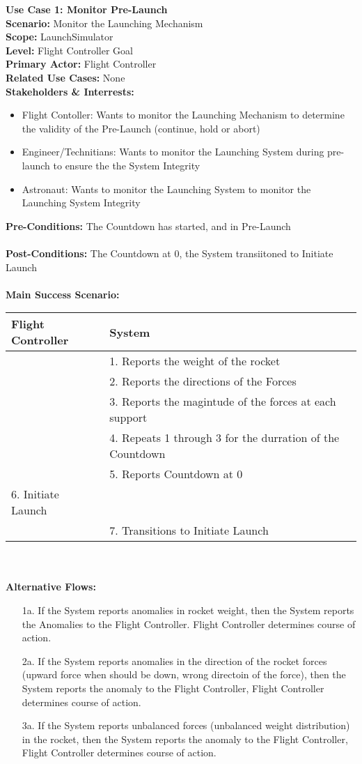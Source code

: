 \documentclass[letterpaper]{article}
\begin{document}
\noindent
\textbf{Use Case 1:  Monitor Pre-Launch}\\
\textbf{Scenario:  }Monitor the Launching Mechanism\\
\textbf{Scope:  }LaunchSimulator\\
\textbf{Level:  }Flight Controller Goal\\
\textbf{Primary Actor:  }Flight Controller\\
\textbf{Related Use Cases:  }None\\
\textbf{Stakeholders \& Interrests:}
\begin{itemize}
\item Flight Contoller:  Wants to monitor the Launching Mechanism to
determine the validity of the Pre-Launch (continue, hold or abort)
\item Engineer/Technitians:  Wants to monitor the Launching System 
during pre-launch to ensure the the System Integrity
\item Astronaut:  Wants to monitor the Launching System to monitor the
Launching System Integrity
\end{itemize}
\textbf{Pre-Conditions:  }The Countdown has started, and in
Pre-Launch\\\\
\textbf{Post-Conditions: }The Countdown at 0, the System transiitoned
to Initiate Launch\\\\
\textbf{Main Success Scenario:}\\
\begin{tabular}{|p{5.75cm}|p{5.75cm}|}\hline
\textbf{Flight Controller} & \textbf{System}\\\hline
& 1.  Reports the weight of the rocket\\\hline
& 2.  Reports the directions of the Forces\\\hline
& 3.  Reports the magintude of the forces at each support\\\hline
& 4.  Repeats 1 through 3 for the durration of the Countdown\\\hline
& 5.  Reports Countdown at 0\\\hline
6.  Initiate Launch &\\\hline
& 7.  Transitions to Initiate Launch\\\hline
\end{tabular}\\\\
\textbf{Alternative Flows:  }
\begin{itemize}
\item[1a.]If the System reports anomalies in rocket weight, then the System
reports the Anomalies to the Flight Controller.  Flight Controller
determines course of action.
\item[2a.]If the System reports anomalies in the direction of the
rocket forces (upward force when should be down, wrong directoin of the
force), then the System reports the anomaly to the Flight Controller,
Flight Controller determines course of action.
\item[3a.]If the System reports unbalanced forces (unbalanced weight
distribution) in the rocket, then the System reports the anomaly to the
Flight Controller, Flight Controller determines course of action.
\end{itemize}
\end{document}
